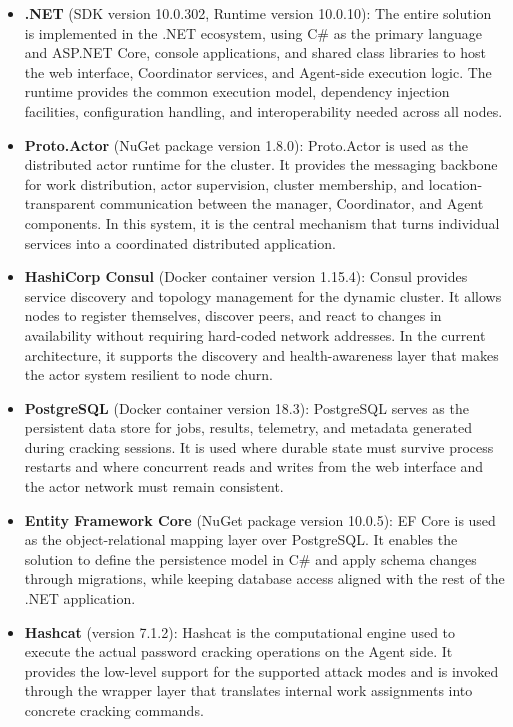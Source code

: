 \begin{itemize}
    \item \textbf{.NET} (SDK version 10.0.302, Runtime version 10.0.10): The entire solution is implemented in the .NET ecosystem, using C\# as the primary language and ASP.NET Core, console applications, and shared class libraries to host the web interface, Coordinator services, and Agent-side execution logic. The runtime provides the common execution model, dependency injection facilities, configuration handling, and interoperability needed across all nodes.

    \item \textbf{Proto.Actor} (NuGet package version 1.8.0): Proto.Actor is used as the distributed actor runtime for the cluster. It provides the messaging backbone for work distribution, actor supervision, cluster membership, and location-transparent communication between the manager, Coordinator, and Agent components. In this system, it is the central mechanism that turns individual services into a coordinated distributed application.

    \item \textbf{HashiCorp Consul} (Docker container version 1.15.4): Consul provides service discovery and topology management for the dynamic cluster. It allows nodes to register themselves, discover peers, and react to changes in availability without requiring hard-coded network addresses. In the current architecture, it supports the discovery and health-awareness layer that makes the actor system resilient to node churn.

    \item \textbf{PostgreSQL} (Docker container version 18.3): PostgreSQL serves as the persistent data store for jobs, results, telemetry, and metadata generated during cracking sessions. It is used where durable state must survive process restarts and where concurrent reads and writes from the web interface and the actor network must remain consistent.

    \item \textbf{Entity Framework Core} (NuGet package version 10.0.5): EF Core is used as the object-relational mapping layer over PostgreSQL. It enables the solution to define the persistence model in C\# and apply schema changes through migrations, while keeping database access aligned with the rest of the .NET application.

    \item \textbf{Hashcat} (version 7.1.2): Hashcat is the computational engine used to execute the actual password cracking operations on the Agent side. It provides the low-level support for the supported attack modes and is invoked through the wrapper layer that translates internal work assignments into concrete cracking commands.


\end{itemize}
